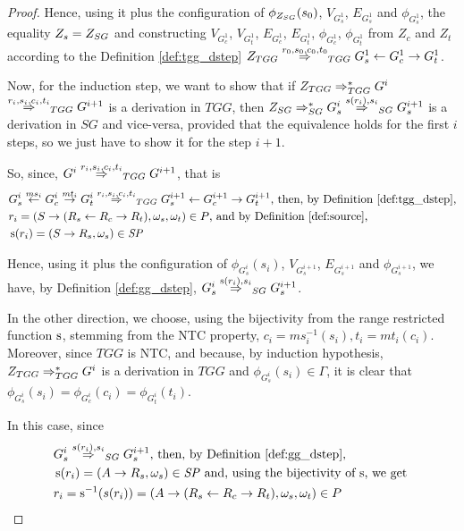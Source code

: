 \documentclass[runningheads]{llncs}
\begin{document}
\begin{proof}
	Hence, using it plus the configuration of $\phi_{Z_{SG}}(s_0)$, $V_{G^1_s}$, $E_{G^1_s}$ and $\phi_{G^1_s}$, the equality $Z_s = Z_{SG}$ and constructing $V_{G^1_c}$, $V_{G^1_t}$, $E_{G^1_c}$, $E_{G^1_t}$, $\phi_{G^1_c}$, $\phi_{G^1_t}$ from $Z_c$ and $Z_t$ according to the Definition \ref{def:tgg_dstep} $\startTG{TGG} \tderiv{r_0}{s_0,c_0,t_0}{TGG} G^1_s \ms{} G^1_c \mt{} G^1_t$.
	
	Now, for the induction step, we want to show that if $Z_{TGG} \Rightarrow^*_{TGG} G^i$ $\tderiv{r_{i}}{s_{i},c_{i},t_{i}}{TGG} G^{i+1}$ is a derivation in $\mathit{TGG}$, then $\startG{SG} \derivtr{SG} G^i_s \deriv{s(r_{i})}{s_{i}}{SG} G^{i+1}_s$ is a derivation in $\mathit{SG}$ and vice-versa, provided that the equivalence holds for the first $i$ steps, so we just have to show it for the step $i+1$.
	
	So, since, $G^i \tderiv{r_{i}}{s_{i},c_{i},t_{i}}{TGG} G^{i+1}$, that is
	\begin{align*}
		& G^i_s \ms{ms_i} G^i_c \mt{mt_i} G^i_t \tderiv{r_i}{s_i,c_i,t_i}{TGG} G^{i+1}_s \ms{} G^{i+1}_c \mt{} G^{i+1}_t \text{, then, by Definition \ref{def:tgg_dstep},}\\
		& r_i = (S \pro (R_s \ms{} R_c \mt{} R_t), \omega_s, \omega_t) \in P \text{, and by Definition \ref{def:source},}\\
		& \source(r_i) = (S \pro R_s, \omega_s) \in \mathit{SP}
	\end{align*}
	
	Hence, using it plus the configuration of $\phi_{G^i_s}(s_i)$, $V_{G^{i+1}_s}$, $E_{G^{i+1}_s}$ and $\phi_{G^{i+1}_s}$, we have, by Definition \ref{def:gg_dstep}, $G_s^i \deriv{\source(r_i)}{s_i}{SG} G^{i+1}_s$.
	
	In the other direction, we choose, using the bijectivity from the range restricted function $\operatorname{s}$, stemming from the NTC property, $c_i = ms_i^{-1}(s_i), t_i = mt_i(c_i)$. Moreover, since $\mathit{TGG}$ is NTC, and because, by induction hypothesis, $Z_{TGG} \Rightarrow^*_{TGG} G^i$ is a derivation in $\mathit{TGG}$ and $\phi_{G^i_s}(s_i) \in \Gamma$, it is clear that $\phi_{G^i_s}(s_i) = \phi_{G^i_c}(c_i) = \phi_{G^i_t}(t_i)$.
	
	In this case, since
	\begin{align*}
		& G^{i}_s \deriv{s(r_i)}{s_i}{SG} G^{i+1}_s \text{, then, by Definition \ref{def:gg_dstep},}\\
		& \source(r_i) = (A \pro R_s, \omega_s) \in \mathit{SP} \text{ and, using the bijectivity of $\source$, we get }\\
		& r_i = \source^{-1}(s(r_i)) = (A \pro (R_s \ms{} R_c \mt{} R_t), \omega_s, \omega_t) \in P
	\end{align*} 
	

\end{proof}
\end{document}
